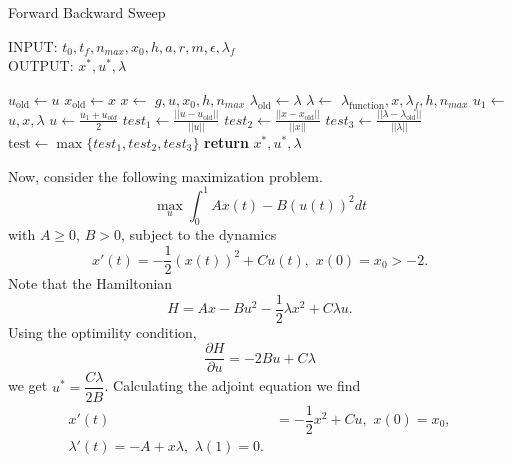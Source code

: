 \begin{algorithm}
	\caption{Forward Backward Sweep }\label{FBSM_alg}
    INPUT: $t_0, t_f, n_{max}, x_0,h, a, r, m, \epsilon, \lambda_{f}$ \\
    OUTPUT: $x^*, u^*, \lambda$ \\
	\begin{algorithmic}[1]
				\State $u_{\text{old}} \gets u$ 
                \State $x_{\text{old}} \gets x$ 
                \State $ x \gets$ %
                        {$g, u, x_0, h,n_{max}$}
                \State $\lambda_{\text{old}} \gets \lambda $
				\State $\lambda \gets$ %
				        {$\lambda_{\text{function}}, x, \lambda_f, h, n_{max}$}
                \State $\displaystyle u_1 \gets$  %
                        {$u, x, \lambda$}
                \State $\displaystyle u \gets \frac{u_1 + u_{old}}{2}$
                \State $test_1 \gets \displaystyle 
                \frac{||u - u_{\text{old}}||}{||u||}$
                \State $test_2 \gets \displaystyle 
                \frac{||x - x_{\text{old}}||}{||x||}$
                \State $test_3 \gets \displaystyle 
                \frac{||\lambda - \lambda_{\text{old}}||}{||\lambda||}$
                \State $\text{test} \gets \max{ \{ test_1, test_2, test_3 \}}$
			\EndWhile\label{}
			\State \textbf{return} $ x^*, u^*, \lambda$
		\EndProcedure
	\end{algorithmic}
\end{algorithm}

    Now, consider the following maximization problem.
    \begin{equation*}
        \max_{u} \int_{0}^{1} Ax(t) - B(u(t))^{2} dt
    \end{equation*}
    with $A \geq 0$, $B>0$, subject to the dynamics
    \begin{equation*}
        x'(t) = -\dfrac{1}{2}(x(t))^{2} + Cu(t), \, \, x(0) = x_0 >-2.
    \end{equation*}
    Note that the Hamiltonian 
    $$
        H = Ax - Bu^2 - \dfrac{1}{2}\lambda x^2 + C\lambda u.
    $$
    Using the optimility condition, 
    $$
        \dfrac{\partial H}{\partial u} = -2Bu + C\lambda
    $$
    we get $u^{*} = \dfrac{C\lambda}{2B}$. Calculating the adjoint equation we
    find
    \begin{align*}
        x'(t) &= -\dfrac{1}{2}x^2 + Cu, \, \, x(0) = x_0, \\
        \lambda'(t) = -A + x \lambda, \, \, \lambda(1) = 0.
    \end{align*}
    
    

    
